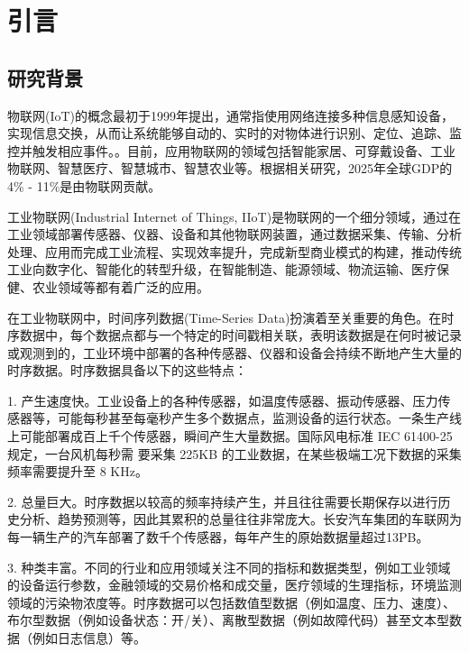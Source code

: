 
\chapter{引言}


\section{研究背景}\label{1-background}


物联网(IoT)的概念最初于1999年提出，通常指使用网络连接多种信息感知设备，实现信息交换，从而让系统能够自动的、实时的对物体进行识别、定位、追踪、监控并触发相应事件。\cite{王保云2009物联网技术研究综述木}。目前，应用物联网的领域包括智能家居、可穿戴设备、工业物联网、智慧医疗、智慧城市、智慧农业等。根据相关研究，2025年全球GDP的4\% - 11\%是由物联网贡献\cite{mouha2021internet}。

工业物联网(Industrial Internet of Things, IIoT)\cite{sisinni2018industrial}是物联网的一个细分领域，通过在工业领域部署传感器、仪器、设备和其他物联网装置，通过数据采集、传输、分析处理、应用而完成工业流程、实现效率提升，完成新型商业模式的构建，推动传统工业向数字化、智能化的转型升级，在智能制造、能源领域、物流运输、医疗保健、农业领域等都有着广泛的应用。

在工业物联网中，时间序列数据(Time-Series Data)\cite{dunning2015tsdb}扮演着至关重要的角色。在时序数据中，每个数据点都与一个特定的时间戳相关联，表明该数据是在何时被记录或观测到的，工业环境中部署的各种传感器、仪器和设备会持续不断地产生大量的时序数据。时序数据具备以下的这些特点：

1. 产生速度快。工业设备上的各种传感器，如温度传感器、振动传感器、压力传感器等，可能每秒甚至每毫秒产生多个数据点，监测设备的运行状态。一条生产线上可能部署成百上千个传感器，瞬间产生大量数据。国际风电标准 IEC 61400-25 规定，一台风机每秒需
要采集 225KB 的工业数据，在某些极端工况下数据的采集频率需要提升至 8 KHz\cite{PZKX202005001}。

2. 总量巨大。时序数据以较高的频率持续产生，并且往往需要长期保存以进行历史分析、趋势预测等，因此其累积的总量往往非常庞大。长安汽车集团的车联网为每一辆生产的汽车部署了数千个传感器，每年产生的原始数据量超过13PB。

3. 种类丰富。不同的行业和应用领域关注不同的指标和数据类型，例如工业领域的设备运行参数，金融领域的交易价格和成交量，医疗领域的生理指标，环境监测领域的污染物浓度等。时序数据可以包括数值型数据（例如温度、压力、速度）、布尔型数据（例如设备状态：开/关）、离散型数据（例如故障代码）甚至文本型数据（例如日志信息）等。

